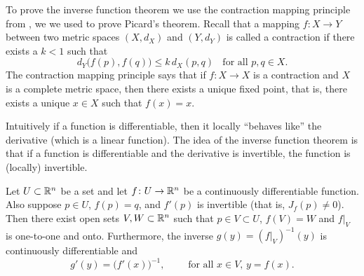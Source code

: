 
To prove the inverse function theorem we use the contraction mapping
principle from ,
we we used
to prove Picard's theorem.
Recall that a mapping $f \colon X \to Y$ between two metric
spaces $(X,d_X)$ and $(Y,d_Y)$ is called a contraction 
if there exists a $k < 1$ such that
\begin{equation*}
d_Y\bigl(f(p),f(q)\bigr) \leq k \, d_X(p,q)
\ \ \ \ \text{for all } p,q \in X.
\end{equation*}
The contraction mapping principle says that if $f \colon X \to X$
is a contraction and $X$ is a complete metric space,
then there exists a unique fixed point, that is,
there exists a unique $x \in X$ such that $f(x) = x$.

Intuitively if a function is differentiable, then it
locally ``behaves like'' the derivative (which is a linear function).
The idea of the inverse function theorem is that if a function is
differentiable and the derivative is invertible, the function is
(locally) invertible.


\begin{thm}
\label{thm:inverse}
Let $U \subset {\mathbb{R}}^n$ be a set and let
$f \colon U \to {\mathbb{R}}^n$ be a continuously differentiable function.
Also suppose $p \in U$, $f(p) = q$, and $f'(p)$ is invertible
(that is, $J_f(p) \not=0$).
Then there exist open sets $V, W \subset {\mathbb{R}}^n$ such that
$p \in V \subset U$, $f(V) = W$ and $f|_V$ is one-to-one and onto.  
Furthermore, the inverse $g(y) = (f|_V)^{-1}(y)$ is continuously differentiable
and 
\begin{equation*}
g'(y) = {\bigl(f'(x)\bigr)}^{-1}, \qquad \text{ for all $x \in V$, $y = f(x)$.}
\end{equation*}
\end{thm}

